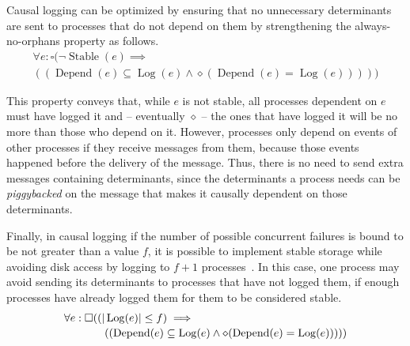 \documentclass[sigconf]{acmart}
\DeclareMathOperator{\Stable}{Stable}
\DeclareMathOperator{\Depend}{Depend}
\DeclareMathOperator{\Log}{Log}
\begin{document}
Causal logging can be optimized by ensuring that no unnecessary determinants are sent to processes that do not depend on them by strengthening the always-no-orphans property as follows.
\begin{equation}\label{eq:causal}
\begin{multlined}
  \forall e: \square ( \neg \Stable(e) \implies \\
  ((\Depend(e) \subseteq \Log(e) \wedge \diamond (\Depend(e) = \Log(e)))))
\end{multlined}
\end{equation}

This property conveys that, while $e$ is not stable, all processes dependent on $e$ must have logged it and  -- eventually $\diamond$ -- the ones that have logged it will be no more than those who depend on it. 
However, processes only depend on events of other processes if they receive  messages from them, because those events happened before the delivery of the message. Thus, there is no need to send extra messages containing determinants, since the determinants a process needs can be \textit{piggybacked} on the message that makes it causally dependent on those determinants.

Finally, in causal logging if the number of possible concurrent failures is bound to be not greater than a value $f$, it is possible to implement stable storage while avoiding disk access by logging to $f + 1$ processes~\cite{alvisi1993nonblocking}.
In this case, one process may avoid sending its determinants to processes that have not logged them, if enough processes have already logged them for them to be considered stable. %
\begin{equation}\label{eq:causalbounded}
\begin{multlined}
\small
  \forall e: \square ( (|\Log(e)| \leq f)  \implies \\
   ~~~~~~~~((\Depend(e) \subseteq \Log(e) \wedge \diamond (\Depend(e) = \Log(e)))))
\end{multlined}
\end{equation}
\end{document}

